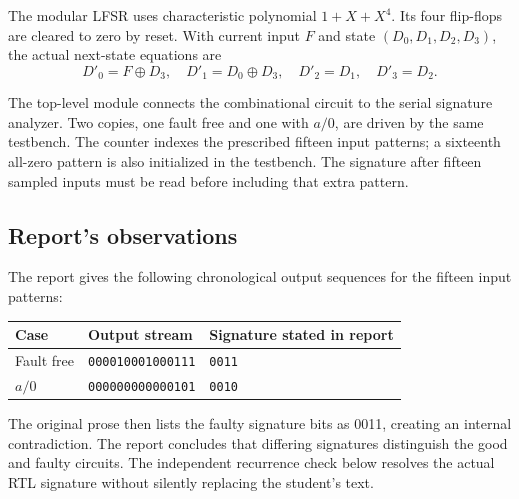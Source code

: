 \documentclass[11pt,a4paper]{article}
\begin{document}
The modular LFSR uses characteristic polynomial $1+X+X^4$. Its four flip-flops are cleared to zero by reset. With current input $F$ and state $(D_0,D_1,D_2,D_3)$, the actual next-state equations are
\[D'_0=F\oplus D_3,\quad D'_1=D_0\oplus D_3,\quad D'_2=D_1,\quad D'_3=D_2.\]
\begin{center}
\end{center}
The top-level module connects the combinational circuit to the serial signature analyzer. Two copies, one fault free and one with $a/0$, are driven by the same testbench. The counter indexes the prescribed fifteen input patterns; a sixteenth all-zero pattern is also initialized in the testbench. The signature after fifteen sampled inputs must be read before including that extra pattern.

\subsection{Report's observations}
The report gives the following chronological output sequences for the fifteen input patterns:
\begin{center}\begin{tabular}{lll}\toprule
Case&Output stream&Signature stated in report\\\midrule
Fault free&\texttt{000010001000111}&\texttt{0011}\\
$a/0$&\texttt{000000000000101}&\texttt{0010}\\\bottomrule
\end{tabular}\end{center}
The original prose then lists the faulty signature bits as 0011, creating an internal contradiction. The report concludes that differing signatures distinguish the good and faulty circuits. The independent recurrence check below resolves the actual RTL signature without silently replacing the student's text.
\end{document}
